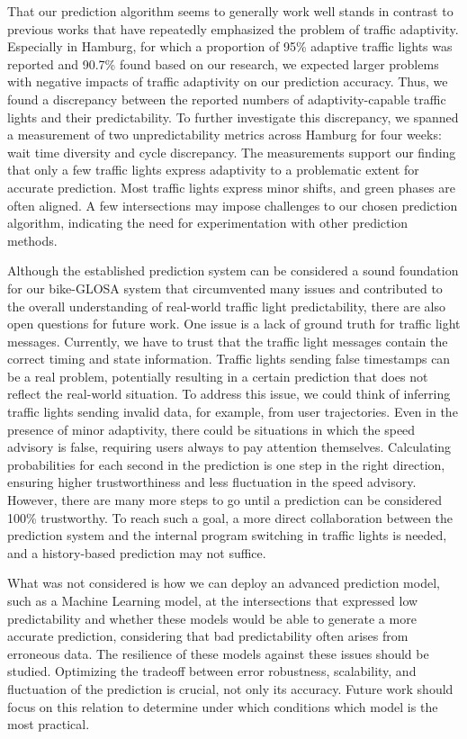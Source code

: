 That our prediction algorithm seems to generally work well stands in contrast to previous works that have repeatedly emphasized the problem of traffic adaptivity. Especially in Hamburg, for which a proportion of 95\% adaptive traffic lights was reported \cite{bodenheimer_enabling_2014} and 90.7\% found based on our research, we expected larger problems with negative impacts of traffic adaptivity on our prediction accuracy. Thus, we found a discrepancy between the reported numbers of adaptivity-capable traffic lights and their predictability. To further investigate this discrepancy, we spanned a measurement of two unpredictability metrics across Hamburg for four weeks: wait time diversity and cycle discrepancy. The measurements support our finding that only a few traffic lights express adaptivity to a problematic extent for accurate prediction. Most traffic lights express minor shifts, and green phases are often aligned. A few intersections may impose challenges to our chosen prediction algorithm, indicating the need for experimentation with other prediction methods.

Although the established prediction system can be considered a sound foundation for our bike-GLOSA system that circumvented many issues and contributed to the overall understanding of real-world traffic light predictability, there are also open questions for future work. One issue is a lack of ground truth for traffic light messages. Currently, we have to trust that the traffic light messages contain the correct timing and state information. Traffic lights sending false timestamps can be a real problem, potentially resulting in a certain prediction that does not reflect the real-world situation. To address this issue, we could think of inferring traffic lights sending invalid data, for example, from user trajectories. Even in the presence of minor adaptivity, there could be situations in which the speed advisory is false, requiring users always to pay attention themselves. Calculating probabilities for each second in the prediction is one step in the right direction, ensuring higher trustworthiness and less fluctuation in the speed advisory. However, there are many more steps to go until a prediction can be considered 100\% trustworthy. To reach such a goal, a more direct collaboration between the prediction system and the internal program switching in traffic lights is needed, and a history-based prediction may not suffice.

What was not considered is how we can deploy an advanced prediction model, such as a Machine Learning model, at the intersections that expressed low predictability and whether these models would be able to generate a more accurate prediction, considering that bad predictability often arises from erroneous data. The resilience of these models against these issues should be studied. Optimizing the tradeoff between error robustness, scalability, and fluctuation of the prediction is crucial, not only its accuracy. Future work should focus on this relation to determine under which conditions which model is the most practical.
